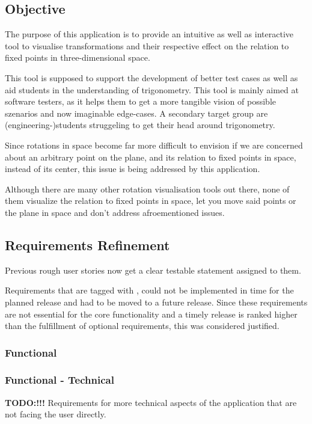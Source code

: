 \subsection{Objective}
The purpose of this application is to provide an intuitive as well as interactive tool to visualise transformations and their respective effect on the relation to fixed points in three-dimensional space. 

This tool is supposed to support the development of better test cases as well as aid students in the understanding of trigonometry. This tool is mainly aimed at software testers, as it helps them to get a more tangible vision of possible szenarios and now imaginable edge-cases. A secondary target group are (engineering-)students struggeling to get their head around trigonometry.

Since rotations in space become far more difficult to envision if we are concerned about an arbitrary point on the plane, and its relation to fixed points in space, instead of its center, this issue is being addressed by this application.

Although there are many other rotation visualisation tools out there, none of them visualize the relation to fixed points in space, let you move said points or the plane in space and don’t address afroementioned issues.

\newpage
\subsection{Requirements Refinement}
Previous rough user stories now get a clear testable statement assigned to them. 

Requirements that are tagged with , could not be implemented in time for the planned release and had to be moved to a future release. \newline Since these requirements are not essential for the core functionality and a timely release is ranked higher than the fulfillment of optional requirements, this was considered justified.


\subsubsection{Functional}


\subsubsection{Functional - Technical}
 \textbf{TODO:!!!}
Requirements for more technical aspects of the application that are not facing the user directly.


